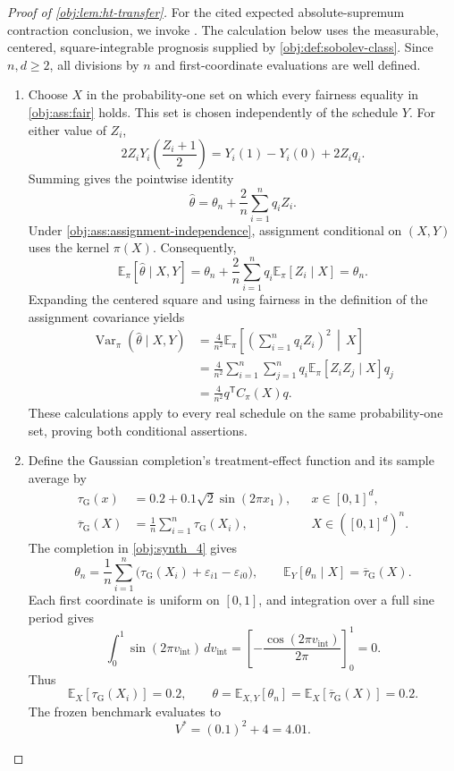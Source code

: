 \documentclass[11pt]{article}
\begin{document}
\begin{proof}[Proof of \cref{obj:lem:ht-transfer}]
For the cited expected absolute-supremum contraction conclusion, we invoke \citep[Theorem 12(4), with the convention of Definition 2]{BartlettMendelson2002Complexities}.
The calculation below uses the measurable, centered, square-integrable prognosis supplied by \cref{obj:def:sobolev-class}. Since \(n,d\geq2\), all divisions by \(n\) and first-coordinate evaluations are well defined.

\begin{enumerate}
\item
Choose \(X\) in the probability-one set on which every fairness equality in \cref{obj:ass:fair} holds. This set is chosen independently of the schedule \(Y\). For either value of \(Z_i\),
\[
2Z_iY_i\!\left(\frac{Z_i+1}{2}\right)
=
Y_i(1)-Y_i(0)+2Z_iq_i.
\]
Summing gives the pointwise identity
\[
\widehat\theta
=
\theta_n+\frac2n\sum_{i=1}^n q_iZ_i.
\]
Under \cref{obj:ass:assignment-independence}, assignment conditional on \((X,Y)\) uses the kernel \(\pi(X)\). Consequently,
\[
\mathbb E_\pi[\widehat\theta\mid X,Y]
=
\theta_n+\frac2n\sum_{i=1}^n
q_i\mathbb E_\pi[Z_i\mid X]
=
\theta_n.
\]
Expanding the centered square and using fairness in the definition of the assignment covariance yields
\[
\begin{aligned}
\operatorname{Var}_\pi(\widehat\theta\mid X,Y)
&=
\frac4{n^2}
\mathbb E_\pi\!\left[
\left(\sum_{i=1}^n q_iZ_i\right)^2
\,\middle|\,X\right]\\
&=
\frac4{n^2}\sum_{i=1}^n\sum_{j=1}^n
q_i\mathbb E_\pi[Z_iZ_j\mid X]q_j\\
&=
\frac4{n^2}q^{\mathsf T}C_\pi(X)q.
\end{aligned}
\]
These calculations apply to every real schedule on the same probability-one set, proving both conditional assertions. %

\item
Define the Gaussian completion's treatment-effect function and its sample average by
\[
\begin{aligned}
\tau_{\mathrm G}(x)
&=
0.2+0.1\sqrt2\sin(2\pi x_1),
&&x\in[0,1]^d,\\
\overline\tau_{\mathrm G}(X)
&=
\frac1n\sum_{i=1}^n\tau_{\mathrm G}(X_i),
&&X\in([0,1]^d)^n.
\end{aligned}
\]
The completion in \cref{obj:synth_4} gives
\[
\theta_n
=
\frac1n\sum_{i=1}^n
\bigl(\tau_{\mathrm G}(X_i)+\varepsilon_{i1}-\varepsilon_{i0}\bigr),
\qquad
\mathbb E_Y[\theta_n\mid X]
=
\overline\tau_{\mathrm G}(X).
\]
Each first coordinate is uniform on \([0,1]\), and integration over a full sine period gives
\[
\int_0^1\sin(2\pi v_{\mathrm{int}})\,dv_{\mathrm{int}}
=
\left[-\frac{\cos(2\pi v_{\mathrm{int}})}{2\pi}\right]_0^1
=
0.
\]
Thus
\[
\mathbb E_X[\tau_{\mathrm G}(X_i)]=0.2,
\qquad
\theta
=
\mathbb E_{X,Y}[\theta_n]
=
\mathbb E_X[\overline\tau_{\mathrm G}(X)]
=
0.2.
\]
The frozen benchmark evaluates to
\[
V^*=(0.1)^2+4=4.01.
\]


\end{enumerate}
\end{proof}
\end{document}
